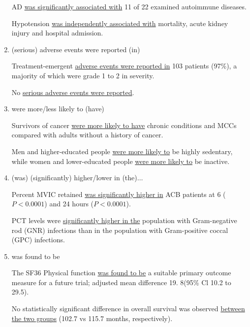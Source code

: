 \documentclass{ctexbook}
\begin{document}
\begin{enumerate}
      \begin{eg}{}
        AD \uline{was significantly associated with} 11 of 22 examined autoimmune diseases.   
      \end{eg}

      \begin{eg}{}
        Hypotension \uline{was independently associated with} mortality, acute kidney injury and hospital admission.    
      \end{eg}

      \item (serious) adverse events were reported (in)
      \begin{eg}{}
        Treatment-emergent \uline{adverse events were reported in} 103 patients (97\%), a majority of which were grade 1 to 2 in severity.
      \end{eg}

      \begin{eg}{}
        No \uline{serious adverse events were reported}.    
      \end{eg}

      \item were more/less likely to (have)
      \begin{eg}{}
        Survivors of cancer \uline{were more likely to have} chronic conditions and MCCs compared with adults without a history of cancer. 
      \end{eg}

      \begin{eg}{}
        Men and higher-educated people \uline{were more likely to} be highly sedentary, while women and lower-educated people \uline{were more likely to} be inactive.
      \end{eg}

      \item (was) (significantly) higher/lower in (the)$\dots$
      \begin{eg}{}
        Percent MVIC retained \uline{was significantly higher in} ACB patients at 6 ($P<0. 000 1$) and 24 hours ($P<0. 000 1$).         
      \end{eg}

      \begin{eg}{}
        PCT levels were \uline{significantly higher in the} population with Gram-negative rod (GNR) infections than in the population with Gram-positive coccal (GPC) infections.         
      \end{eg}

      \item was found to be
      \begin{eg}{}
        The SF36 Physical function \uline{was found to be} a suitable primary outcome measure for a future trial; adjusted mean difference 19. 8(95\% Cl 10.2 to 29.5).   
      \end{eg}

      \begin{eg}{}
        No statistically significant difference in overall survival was observed \uline{between the two groups} (102.7 vs 115.7 months, respectively). 
      \end{eg}
    \end{enumerate}
\end{document}
